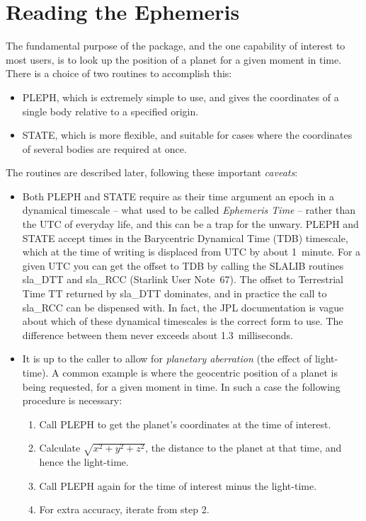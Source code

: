 \section{Reading the Ephemeris}
The fundamental purpose of the package, and the one capability
of interest to most users, is to look up the position of
a planet for a given moment in time.
There is a choice of two routines to accomplish this:
\begin{itemize}
\item PLEPH, which is extremely simple to use, and gives
the coordinates of a single body relative to a specified
origin.
\item STATE, which is more flexible, and suitable for
cases where the coordinates
of several bodies are required at once.
\end{itemize}
The routines are described later, following these
important {\it caveats}\/:
\begin{itemize}
\item Both PLEPH and STATE
require as their time argument an epoch in a dynamical
timescale -- what used to be called
{\it Ephemeris Time}\/ -- rather than the UTC of everyday life,
and this can be a trap for the unwary.
PLEPH and STATE accept times in the
Barycentric Dynamical Time (TDB) timescale, which
at the time of writing is displaced from UTC by about
1~minute.  For a given UTC you can get the offset
to TDB by calling the SLALIB routines sla\_DTT and sla\_RCC
(Starlink User Note~67).  The offset to Terrestrial Time TT
returned by sla\_DTT dominates, and in practice the
call to sla\_RCC can be
dispensed with.  In fact, the JPL documentation is vague
about which of these dynamical timescales is the correct
form to use.  The difference between them
never exceeds about 1.3~milliseconds.
\item It is up to the caller to allow for {\it planetary
aberration}\/ (the effect of light-time).  A
common example is where the geocentric position of a planet is being
requested, for a given moment in time.  In such a case the
following procedure is necessary:
\begin{enumerate}
\item Call PLEPH to get the planet's coordinates
at the time of interest.
\item Calculate $\sqrt{x^{2}+y^{2}+z^{2}}$,
the distance to the planet at that time,
and hence the light-time.
\item Call PLEPH again for the time of interest minus the
light-time.
\item For extra accuracy, iterate from step 2.
\end{enumerate}
\end{itemize}

